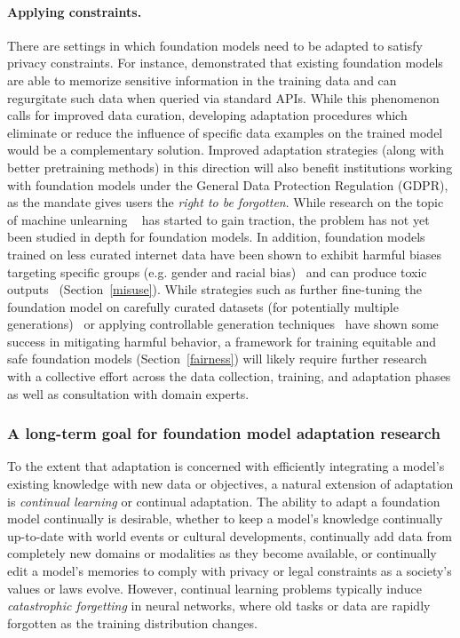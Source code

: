 \paragraph{Applying constraints.} There are settings in which foundation models need to be adapted to satisfy privacy constraints. For instance, \citet{carlini2020extracting} demonstrated that existing foundation models are able to memorize sensitive information in the training data and can regurgitate such data when queried via standard APIs. While this phenomenon calls for improved data curation, developing adaptation procedures which eliminate or reduce the influence of specific data examples on the trained model would be a complementary solution. Improved adaptation strategies (along with better pretraining methods) in this direction will also benefit institutions working with foundation models under the General Data Protection Regulation (GDPR), as the mandate gives users the \emph{right to be forgotten}. While research on the topic of machine unlearning ~\citep{bourtoule2019machine,cao2015towards} has started to gain traction, the problem has not yet been studied in depth for foundation models. In addition, foundation models trained on less curated internet data have been shown to exhibit harmful biases targeting specific groups (e.g. gender and racial bias)~\citep{bender2021,basta2019evaluating,kurita2019measuring,sheng-etal-2019-woman} and can produce toxic outputs~\citep{gehman-etal-2020-realtoxicityprompts} (Section~\ref{misuse}).
While strategies such as further fine-tuning the foundation model on carefully curated datasets (for potentially multiple generations)~\citep{solaiman2021process} or applying controllable generation techniques~\citep{keskar2019ctrl} have shown some success in mitigating harmful behavior, a framework for training equitable and safe foundation models (Section~\ref{fairness}) will likely require further research with a collective effort across the data collection, training, and adaptation phases as well as consultation with domain experts.

\subsubsection{A long-term goal for foundation model adaptation research} To the extent that adaptation is concerned with efficiently integrating a model's existing knowledge with new data or objectives, a natural extension of adaptation is \textit{continual learning} \cite{mccloskey1989catastrophic,parisi2018continual} or continual adaptation. The ability to adapt a foundation model continually is desirable, whether to keep a model's knowledge continually up-to-date with world events or cultural developments, continually add data from completely new domains or modalities as they become available, or continually edit a model's memories to comply with privacy or legal constraints as a society's values or laws evolve. However, continual learning problems typically induce \textit{catastrophic forgetting} \cite{mccloskey1989catastrophic,Ratcliff1990ConnectionistMO,catastroph} in neural networks, where old tasks or data are rapidly forgotten as the training distribution changes.

